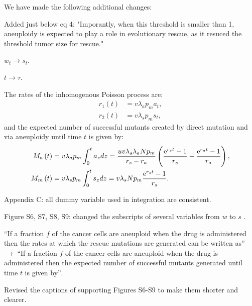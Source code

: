 \documentclass[12pt]{extarticle}
\newcommand{\e}{{\rm e}}
\renewcommand{\Delta}{r}
\begin{document}
{\color{blue}


We have made the following additional changes:

Added just below eq 4: "Imporantly, when this threshold is smaller than 1, aneuploidy is expected to play a role in evolutionary rescue, as it resuced the threshold tumor size for rescue." 

$w_t\rightarrow s_t$. %

$t\rightarrow \tau$. %

The rates of the inhomogenous Poisson process are: %
\begin{align*}
r_1\left(t\right)&=v\lambda_ap_ma_{t},\\ 
r_2\left(t\right)&=v\lambda_sp_ms_{t},
\end{align*}
and the expected number of successful mutants created by direct mutation and via aneuploidy until time $t$ is given by:
\begin{align*}
M_a\left(t\right)&=v\lambda_ap_m\int_0^ta_{z} d z = \frac{uv\lambda_s\lambda_aNp_m}{\Delta_s-\Delta_a}\left(\frac{\e^{\Delta_st}-1}{\Delta_s}-\frac{\e^{\Delta_at}-1}{\Delta_a}\right),\\ 
M_m\left(t\right)&=v\lambda_sp_m\int_0^ts_{z} d z = v\lambda_sNp_m\frac{\e^{\Delta_s t}-1}{\Delta_s}.
\end{align*}
 

Appendix C: all dummy variable used in integration are consistent. %

Figure S6, S7, S8, S9: changed the subscripts of several variables from $w$ to $s$ . %

``If a fraction $f$ of the cancer cells are aneuploid when the drug is administered then the rates at which the rescue mutations are generated can be written as'' $\rightarrow$
``If a fraction $f$ of the cancer cells are aneuploid when the drug is administered then the expected number of successful mutants generated until time $t$ is given by''. %

Revised the captions of supporting Figures S6-S9 to make them shorter and clearer.

}



\end{document}
